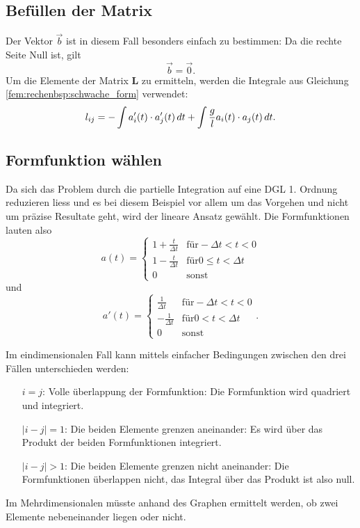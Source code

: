 \subsection{Befüllen der Matrix}
Der Vektor $\vec{b}$ ist in diesem Fall besonders einfach zu bestimmen: Da die rechte Seite Null ist, gilt
\begin{equation}
    \vec{b} = \vec{0}.
\end{equation}
Um die Elemente der Matrix $\mathbf{L}$ zu ermitteln, werden die Integrale aus Gleichung \ref{fem:rechenbsp:schwache_form} verwendet:
\begin{equation}
    l_{ij} = - \int a_i'(t) \cdot a_j'(t) \, d t + \int \frac{g}{l} a_i(t) \cdot a_j(t) \, d t.
\end{equation}


\subsection{Formfunktion wählen}
Da sich das Problem durch die partielle Integration auf eine DGL 1. Ordnung reduzieren liess und es bei diesem Beispiel vor allem um das Vorgehen und nicht um präzise Resultate geht, wird der lineare Ansatz gewählt.
Die Formfunktionen lauten also 
\begin{equation}
    a(t) = \left\{ \begin{array}{ll}
        1+\frac{t}{\Delta t} & \mbox{für} -\Delta t < t < 0 \\
        1-\frac{t}{\Delta t} & \mbox{für} 0 \leq t < \Delta t \\
        0 & \mbox{sonst}
    \end{array} \right.
\end{equation}
und
\begin{equation}
    a'(t) = \left\{ \begin{array}{ll}
        \frac{1}{\Delta t} & \mbox{für} -\Delta t < t < 0 \\
        -\frac{1}{\Delta t} & \mbox{für} 0 < t < \Delta t \\
        0 & \mbox{sonst}
    \end{array} \right. .
\end{equation}

Im eindimensionalen Fall kann mittels einfacher Bedingungen zwischen den drei Fällen unterschieden werden:
\begin{itemize}
    \item[$i = j$:] Volle überlappung der Formfunktion: Die Formfunktion wird quadriert und integriert. 
    \item[$|i - j| = 1$:] Die beiden Elemente grenzen aneinander: Es wird über das Produkt der beiden Formfunktionen integriert.
    \item[$|i - j| > 1$:] Die beiden Elemente grenzen nicht aneinander: Die Formfunktionen überlappen nicht, das Integral über das Produkt ist also null.
\end{itemize}
Im Mehrdimensionalen müsste anhand des Graphen ermittelt werden, ob zwei Elemente nebeneinander liegen oder nicht.

